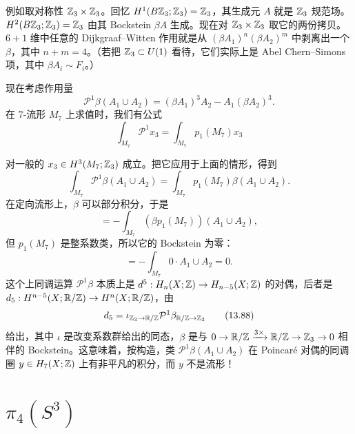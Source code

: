 例如取对称性 $\mathbb{Z}_3\times\mathbb{Z}_3$。回忆 $H^1(B\mathbb{Z}_3;\mathbb{Z}_3)=\mathbb{Z}_3$，其生成元 $A$ 就是 $\mathbb{Z}_3$ 规范场。$H^2(B\mathbb{Z}_3;\mathbb{Z}_3)=\mathbb{Z}_3$ 由其 Bockstein $\beta A$ 生成。现在对 $\mathbb{Z}_3\times\mathbb{Z}_3$ 取它的两份拷贝。$6+1$ 维中任意的 Dijkgraaf--Witten 作用就是从 $(\beta A_1)^n(\beta A_2)^m$ 中剥离出一个 $\beta$，其中 $n+m=4$。（若把 $\mathbb{Z}_3\subset U(1)$ 看待，它们实际上是 Abel Chern--Simons 项，其中 $\beta A_i\sim F_i$。）

现在考虑作用量
\begin{equation}
\mathcal P^1\beta(A_1\cup A_2)=(\beta A_1)^3A_2-A_1(\beta A_2)^3. \tag{13.83}
\end{equation}
在 7-流形 $M_7$ 上求值时，我们有公式
\begin{equation}
\int_{M_7}\mathcal P^1x_3=\int_{M_7}p_1(M_7)x_3 \tag{13.84}
\end{equation}

对一般的 $x_3\in H^3(M_7;\mathbb{Z}_3)$ 成立。把它应用于上面的情形，得到
\begin{equation}
\int_{M_7}\mathcal P^1\beta(A_1\cup A_2)=\int_{M_7}p_1(M_7)\beta(A_1\cup A_2). \tag{13.85}
\end{equation}
在定向流形上，$\beta$ 可以部分积分，于是
\begin{equation}
=-\int_{M_7}(\beta p_1(M_7))(A_1\cup A_2), \tag{13.86}
\end{equation}
但 $p_1(M_7)$ 是整系数类，所以它的 Bockstein 为零：
\begin{equation}
=-\int_{M_7}0\cdot A_1\cup A_2=0. \tag{13.87}
\end{equation}
这个上同调运算 $\mathcal P^1\beta$ 本质上是 $d^5:H_n(X;\mathbb{Z})\to H_{n-5}(X;\mathbb{Z})$ 的对偶，后者是 $d_5:H^{n-5}(X;\mathbb{R}/\mathbb{Z})\to H^n(X;\mathbb{R}/\mathbb{Z})$，由
\begin{equation}
d_5=\iota_{\mathbb{Z}_3\to\mathbb{R}/\mathbb{Z}}\mathcal P^1\beta_{\mathbb{R}/\mathbb{Z}\to\mathbb{Z}_3} \tag{13.88}
\end{equation}
给出，其中 $\iota$ 是改变系数群给出的同态，$\beta$ 是与 $0\to\mathbb{R}/\mathbb{Z}\xrightarrow{3\times}\mathbb{R}/\mathbb{Z}\to\mathbb{Z}_3\to0$ 相伴的 Bockstein。这意味着，按构造，类 $\mathcal P^1\beta(A_1\cup A_2)$ 在 Poincaré 对偶的同调圈 $y\in H_7(X;\mathbb{Z})$ 上有非平凡的积分，而 $y$ 不是流形！


\section{$\pi_4(S^3)$}

